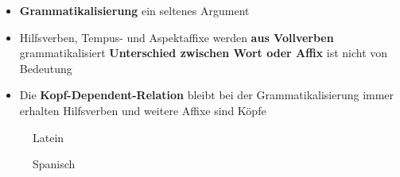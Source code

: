 \begin{frame}

\begin{itemize}
	\item \textbf{Grammatikalisierung} \ras ein seltenes Argument \citep{Haspelmath94a}
	\item Hilfsverben, Tempus- und Aspektaffixe werden \textbf{aus Vollverben} grammatikalisiert \ras \textbf{Unterschied zwischen Wort oder Affix} ist nicht von Bedeutung
	\item Die \textbf{Kopf-Dependent-Relation} bleibt bei der Grammatikalisierung immer erhalten \ras Hilfsverben und weitere Affixe sind Köpfe 
\end{itemize}


\begin{figure}[b]
	\begin{minipage}[b]{0.40\textwidth}
	\centering
		\caption{Latein}	
  	\end{minipage}  
  	\pause            
	\begin{minipage}[c]{0.07\textwidth}
	\hfill
  	\end{minipage}
  	\begin{minipage}[b]{0.40\textwidth}
	\centering
		\caption{Spanisch}
  	\end{minipage}  
  	
\end{figure}


\end{frame}


